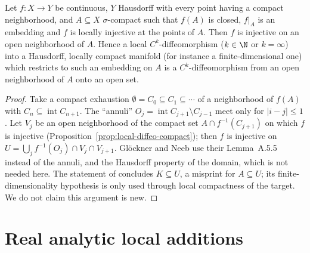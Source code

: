 \begin{proposition}
  \label{prop:local-diffeo-sigma-compact}
  \leanok
  Let $f \colon X \to Y$ be continuous, $Y$ Hausdorff with every point having a compact
  neighborhood, and $A \subseteq X$ $\sigma$-compact such that $f(A)$ is closed, $f|_A$ is an
  embedding and $f$ is locally injective at the points of $A$. Then $f$ is injective on an open
  neighborhood of $A$. Hence a local $C^k$-diffeomorphism ($k \in \N$ or $k = \infty$) into a
  Hausdorff, locally compact manifold (for instance a finite-dimensional one) which restricts to
  such an embedding on $A$ is a $C^k$-diffeomorphism from an open neighborhood of $A$ onto an open
  set.
\end{proposition}

\begin{proof}
  \leanok
  Take a compact exhaustion $\emptyset = C_0 \subseteq C_1 \subseteq \cdots$ of a neighborhood of
  $f(A)$ with $C_n \subseteq \operatorname{int} C_{n+1}$. The ``annuli''
  $O_j = \operatorname{int} C_{j+1} \setminus C_{j-1}$ meet only for $|i - j| \le 1$. Let $V_j$
  be an open neighborhood of the compact set $A \cap f^{-1}(C_{j+1})$ on which $f$ is injective
  (Proposition~\ref{prop:local-diffeo-compact}); then $f$ is injective on
  $U = \bigcup_j f^{-1}(O_j) \cap V_j \cap V_{j+1}$. Glöckner and Neeb use their Lemma~A.5.5
  instead of the annuli, and the Hausdorff property of the domain, which is not needed here. The
  statement of \cite[Cor.~3.8.21]{GN26} concludes $K \subseteq U$, a misprint for $A \subseteq U$;
  its finite-dimensionality hypothesis is only used through local compactness of the target. We
  do not claim this argument is new.
\end{proof}

\section{Real analytic local additions}

